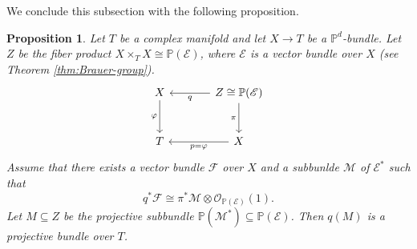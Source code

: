\documentclass[english,reqno]{amsart}
\newcommand\bbP{{\mathbb P}}
\newcommand\sE{{\mathscr E}}
\newcommand\sF{{\mathscr F}}
\newcommand\sL{{\mathscr L}}
\newcommand\sM{{\mathscr M}}
\newcommand\sO{{\mathscr O}}
\theoremstyle{plain}
\newtheorem{prop}[thm]{Proposition}
\theoremstyle{definition}
\newtheorem{remark}[thm]{Remark}
\numberwithin{equation}{section} %
\begin{document}


We conclude this subsection with the following   proposition.

\begin{prop}
	\label{prop:smothness-image-subbundle}
	Let $T$ be a complex manifold and let $X\rightarrow T$ be a $\bbP^d$-bundle. Let $Z$ be the fiber product $X\times_T X\cong \bbP(\sE)$, where $\sE$ is a vector bundle over $X$ (see Theorem \ref{thm:Brauer-group}).
	\[
	\begin{tikzcd}[column sep=large, row sep=large]
	X\dar[swap]{\varphi} & Z  \cong \bbP(\sE) \lar{q}\dar[swap]{\pi} \\
	T &
	X\lar{p=\varphi}
	\end{tikzcd}
	\]
	Assume that there exists a vector bundle $\sF$ over $X$ and a subbunlde $\sM$ of $\sE^*$ such that 
	\[
	q^*\sF\cong \pi^*\sM\otimes \sO_{\bbP(\sE)}(1).
	\]
	Let $M\subseteq Z$ be the projective subbundle $\bbP(\sM^*) \subseteq \bbP(\sE)$. Then $q(M)$ is a projective bundle over $T$.
\end{prop}
\end{document}
